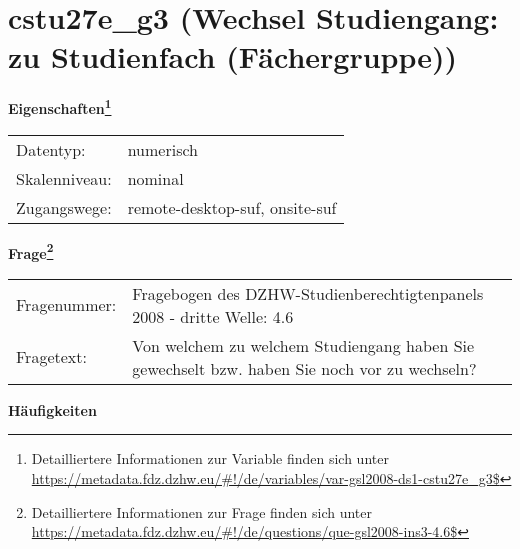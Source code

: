 
    \setcounter{footnote}{0}

    \vspace*{-1.8cm}
	\section{cstu27e\_g3 (Wechsel Studiengang: zu Studienfach (Fächergruppe))}
	\label{section:cstu27e_g3}



    \vspace*{0.5cm}
    \noindent\textbf{Eigenschaften\footnote{Detailliertere Informationen zur Variable finden sich unter
		\url{https://metadata.fdz.dzhw.eu/\#!/de/variables/var-gsl2008-ds1-cstu27e_g3$}}}\\
	\begin{tabularx}{\hsize}{@{}lX}
	Datentyp: & numerisch \\
	Skalenniveau: & nominal \\
	Zugangswege: &
	  remote-desktop-suf, 
	  onsite-suf
 \\
    \end{tabularx}



				\vspace*{0.5cm}
                \noindent\textbf{Frage\footnote{Detailliertere Informationen zur Frage finden sich unter
		              \url{https://metadata.fdz.dzhw.eu/\#!/de/questions/que-gsl2008-ins3-4.6$}}}\\
				\begin{tabularx}{\hsize}{@{}lX}
					Fragenummer: &
					  Fragebogen des DZHW-Studienberechtigtenpanels 2008 - dritte Welle:
					  4.6
 \\
					Fragetext: & Von welchem zu welchem Studiengang haben Sie gewechselt bzw. haben Sie noch vor zu wechseln? \\
				\end{tabularx}





        		\vspace*{0.5cm}
                \noindent\textbf{Häufigkeiten}

